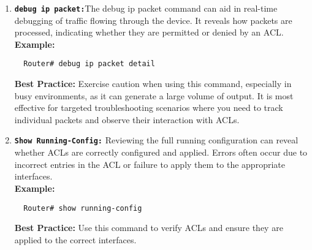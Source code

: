 \documentclass[11pt,a4paper]{article}
\begin{document}
\begin{enumerate}
        \item \textbf{\lstinline{debug ip packet:}}The debug ip packet command can aid in real-time debugging of traffic flowing through the device. It reveals how packets are processed, indicating whether they are permitted or denied by an ACL.
        \\[1em]
        \textbf{Example:}
\begin{lstlisting}
  Router# debug ip packet detail                                        
\end{lstlisting}
        \textbf{Best Practice:} Exercise caution when using this command, especially in busy environments, as it can generate a large volume of output. It is most effective for targeted troubleshooting scenarios where you need to track individual packets and observe their interaction with ACLs.

        \item \textbf{\lstinline{Show Running-Config:}} Reviewing the full running configuration can reveal whether ACLs are correctly configured and applied. Errors often occur due to incorrect entries in the ACL or failure to apply them to the appropriate interfaces.
        \\[1em]
        \textbf{Example:}
\begin{lstlisting}
  Router# show running-config                                       
\end{lstlisting}
        \textbf{Best Practice:} Use this command to verify ACLs and ensure they are applied to the correct interfaces.    
    \end{enumerate}
\end{document}
